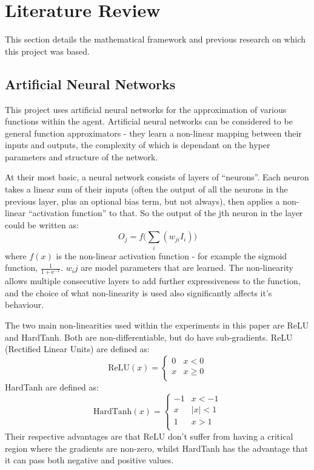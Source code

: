 \section{Literature Review}
This section details the mathematical framework and previous research on which this project was based.

\subsection{Artificial Neural Networks}
This project uses artificial neural networks for the approximation of various functions within the agent. Artificial neural networks can be considered to be general function approximators - they learn a non-linear mapping between their inputs and outputs, the complexity of which is dependant on the hyper parameters and structure of the network.

At their most basic, a neural network consists of layers of ``neurons''. Each neuron takes a linear sum of their inputs (often the output of all the neurons in the previous layer, plus an optional bias term, but not always), then applies a non-linear ``activation function'' to that.  So the output of the jth neuron in the layer could be written as:
\begin{equation}
O_j = f\big( \sum_i (w_{ji}I_i)\big)
\end{equation} where $f(x)$ is the non-linear activation function - for example the sigmoid function, $\frac{1}{1+ \text{e}^{-x}}$.  $w_ij$ are model parameters that are learned. The non-linearity allows multiple consecutive layers to add further expressiveness to the function, and the choice of what non-linearity is used also significantly affects it's behaviour.

The two main non-linearities used within the experiments in this paper are ReLU and HardTanh. Both are non-differentiable, but do have sub-gradients. ReLU (Rectified Linear Units) are defined as:
\begin{equation}
\text{ReLU}(x) = \begin{cases}
0 & x < 0 \\
x & x \ge 0 \\
\end{cases}
\end{equation}
HardTanh are defined as:
\begin{equation}
\text{HardTanh}(x) = \begin{cases}
-1 & x < -1 \\
x & |x| < 1 \\
1 & x > 1 \\
\end{cases}
\end{equation}
Their respective advantages are that ReLU don't suffer from having a critical region where the gradients are non-zero, whilst HardTanh has the advantage that it can pass both negative and positive values.

